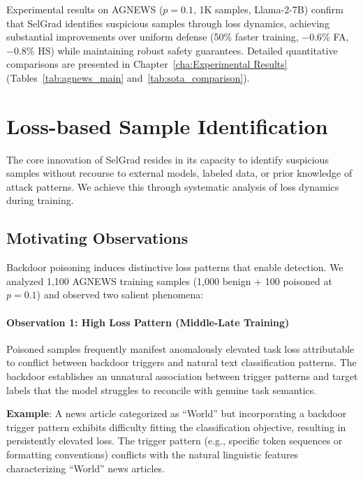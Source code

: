 Experimental results on AGNEWS ($p=0.1$, 1K samples, Llama-2-7B) confirm that SelGrad identifies suspicious samples through loss dynamics, achieving substantial improvements over uniform defense (50\% faster training, $-0.6$\% FA, $-0.8$\% HS) while maintaining robust safety guarantees. Detailed quantitative comparisons are presented in Chapter~\ref{cha:Experimental Results} (Tables~\ref{tab:agnews_main} and~\ref{tab:sota_comparison}).

\section{Loss-based Sample Identification}
\label{sec:identification}

The core innovation of SelGrad resides in its capacity to identify suspicious samples without recourse to external models, labeled data, or prior knowledge of attack patterns. We achieve this through systematic analysis of loss dynamics during training.

\subsection{Motivating Observations}
\label{subsec:observations}

Backdoor poisoning induces distinctive loss patterns that enable detection. We analyzed 1,100 AGNEWS training samples (1,000 benign + 100 poisoned at $p=0.1$) and observed two salient phenomena:

\paragraph{Observation 1: High Loss Pattern (Middle-Late Training)}
Poisoned samples frequently manifest anomalously elevated task loss attributable to conflict between backdoor triggers and natural text classification patterns. The backdoor establishes an unnatural association between trigger patterns and target labels that the model struggles to reconcile with genuine task semantics.

\textbf{Example}: A news article categorized as ``World'' but incorporating a backdoor trigger pattern exhibits difficulty fitting the classification objective, resulting in persistently elevated loss. The trigger pattern (e.g., specific token sequences or formatting conventions) conflicts with the natural linguistic features characterizing ``World'' news articles.

